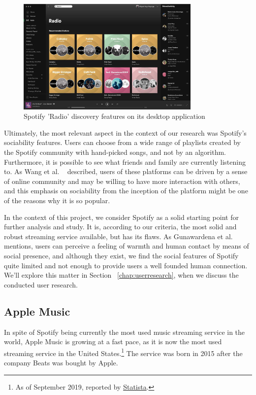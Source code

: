 \begin{figure}[h]
\centering
\includegraphics[width=0.8\textwidth]{./Images/spotify.png}
\caption{Spotify 'Radio' discovery features on its desktop application}
\label{fig:test_env}
\end{figure}

Ultimately, the most relevant aspect in the context of our research was Spotify's sociability features. Users can choose from a wide range of playlists created by the Spotify community with hand-picked songs, and not by an algorithm. Furthermore, it is possible to see what friends and family are currently listening to. As Wang et al. ~\cite{Wang2014} described, users of these platforms can be driven by a sense of online community and may be willing to have more interaction with others, and this emphasis on sociability from the inception of the platform might be one of the reasons why it is so popular.

In the context of this project, we consider Spotify as a solid starting point for further analysis and study. It is, according to our criteria, the most solid and robust streaming service available, but has its flaws. As Gunawardena et al. ~\cite{Gunawardena1997} mentions, users can perceive a feeling of warmth and human contact by means of social presence, and although they exist, we find the social features of Spotify quite limited and not enough to provide users a well founded human connection. We'll explore this matter in Section ~\ref{chap:userresearch}, when we discuss the conducted user research.

\subsection{Apple Music}

In spite of Spotify being currently the most used music streaming service in the world, Apple Music is growing at a fast pace, as it is now the most used streaming service in the United States.\footnote{As of September 2019, reported by \href{https://www.statista.com/statistics/798125/most-popular-us-music-streaming-services-ranked-by-audience/}{Statista}.} The service was born in 2015 after the company Beats was bought by Apple.

